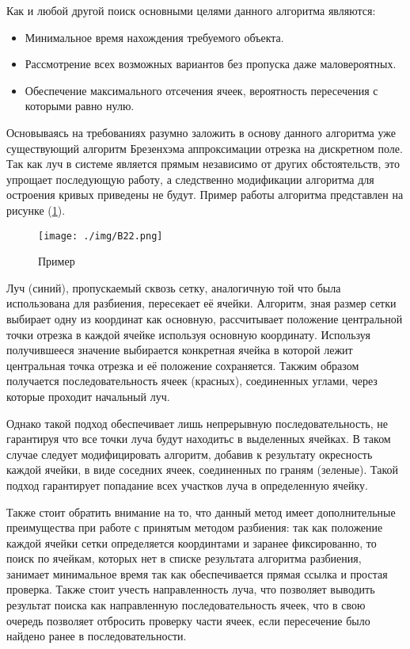 Как и любой другой поиск основными целями данного алгоритма являются: 

\begin{itemize}
	\item Минимальное время нахождения требуемого объекта.
	\item Рассмотрение всех возможных вариантов без пропуска даже маловероятных.
	\item Обеспечение максимального отсечения ячеек, вероятность пересечения с которыми равно нулю. 
\end{itemize} 

Основываясь на требованиях разумно заложить в основу данного алгоритма уже существующий алгоритм Брезенхэма аппроксимации отрезка на дискретном поле. Так как луч в  системе является прямым независимо от других обстоятельств, это упрощает последующую работу, а следственно модификации алгоритма для остроения кривых приведены не будут. Пример работы алгоритма представлен на рисунке  (\ref{pic:B22}).

\begin{figure} 
\begin{center}
\texttt{[image: ./img/B22.png]}
\end{center}
\caption{Пример}
\label{pic:B22}
\end{figure}

Луч (синий), пропускаемый сквозь сетку, аналогичную той что была использована для разбиения, пересекает её ячейки. Алгоритм, зная размер сетки выбирает одну из координат как основную, рассчитывает положение центральной точки отрезка в каждой ячейке используя основную координату. Используя получившееся значение выбирается конкретная ячейка в которой лежит центральная точка отрезка и её положение сохраняется. Такжим образом получается последовательность ячеек (красных), соединенных углами, через которые проходит начальный луч.

Однако такой подход обеспечивает лишь непрерывную последовательность, не гарантируя что все точки луча будут находитьс в выделенных ячейках. В таком случае следует модифицировать алгоритм, добавив к результату окресность каждой ячейки, в виде соседних ячеек, соединенных по граням (зеленые). Такой подход гарантирует попадание всех участков луча в определенную ячейку.

Также стоит обратить внимание на то, что данный метод имеет дополнительные преимущества при работе с принятым методом разбиения: так как положение каждой ячейки сетки определяется координтами и заранее фиксированно, то поиск по ячейкам, которых нет в списке результата алгоритма разбиения, занимает минимальное время так как обеспечивается прямая ссылка и простая проверка. Также стоит учесть направленность луча, что позволяет выводить результат поиска как направленную последовательность ячеек, что в свою очередь позволяет отбросить проверку части ячеек, если пересечение было найдено ранее в последовательности.

